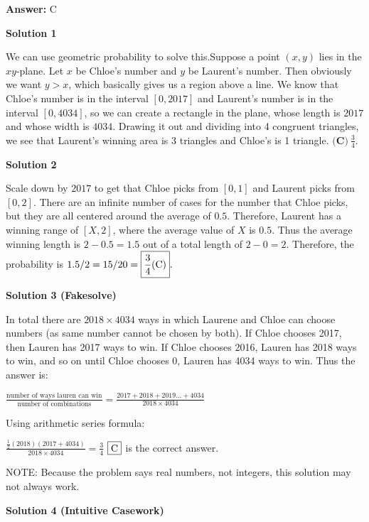 \begin{enumerate}
 \textbf{Answer: }C



\textbf{Solution 1}

We can use geometric probability to solve this.Suppose a point $(x,y)$ lies in the $xy$-plane. Let $x$ be Chloe's number and $y$ be Laurent's number. Then obviously we want $y>x$, which basically gives us a region above a line. We know that Chloe's number is in the interval $[0,2017]$ and Laurent's number is in the interval $[0,4034]$, so we can create a rectangle in the plane, whose length is $2017$ and whose width is $4034$. Drawing it out and dividing into 4 congruent triangles, we see that Laurent's winning area is 3 triangles and Chloe's  is 1 triangle. $\boxed{\textbf{(C)}\ \frac{3}{4}}$.

 



\textbf{Solution 2}

Scale down by $2017$ to get that Chloe picks from $[0,1]$ and Laurent picks from $[0,2]$. There are an infinite number of cases for the number that Chloe picks, but they are all centered around the average of $0.5$. Therefore, Laurent has a winning range of $[X, 2]$, where the average value of $X$ is $0.5$. Thus the average winning length is $2-0.5=1.5$ out of a total length of $2-0=2$. Therefore, the probability is $1.5/2=15/20=\boxed{\frac{3}{4} \space \text{(C)}}.$




\textbf{Solution 3 (Fakesolve)}

In total there are $2018\times4034$ ways in which Laurene and Chloe can choose numbers (as same number cannot be chosen by both). If Chloe chooses 2017, then Lauren has 2017 ways to win. If Chloe chooses 2016, Lauren has 2018 ways to win, and so on until Chloe chooses 0, Lauren has 4034 ways to win. Thus the answer is:

 $\frac{\text{number of ways lauren can win}}{\text{number of combinations}}=\frac{2017+2018+2019...+4034}{2018\times4034}$

 Using arithmetic series formula:

 $\frac{\frac{1}{2}(2018)(2017+4034)}{2018\times4034}=\frac{3}{4}$
$\fbox{C}$ is the correct answer.

 NOTE: Because the problem says real numbers, not integers, this solution may not always work.

 



\textbf{Solution 4 (Intuitive Casework)}


\end{enumerate}
